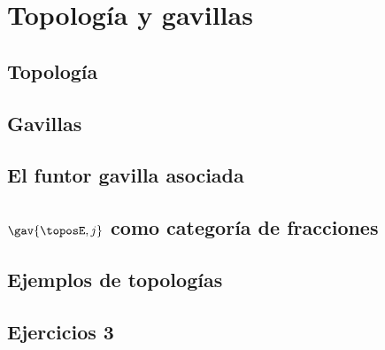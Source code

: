 \chapter{Topología y gavillas}
\label{cap:3}

\section{Topología}
\label{sec:3.1}

\section{Gavillas}
\label{sec:3.2}

\section{El funtor gavilla asociada}
\label{sec:3.3}

\section{\(\gav{\toposE,j}\) como categoría de fracciones}
\label{sec:3.4}

\section{Ejemplos de topologías}
\label{sec:3.5}

\section*{Ejercicios 3}
\label{sec:ejercicios-3}
